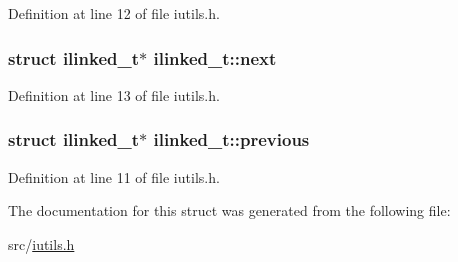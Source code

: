Definition at line 12 of file iutils.\-h.

\hypertarget{structilinked__t_ad3f173c464d58934b12da4eca2ff83f8}{
\subsubsection[{next}]{\setlength{\rightskip}{0pt plus 5cm}struct {\bf ilinked\-\_\-t}$\ast$ ilinked\-\_\-t\-::next}}\label{structilinked__t_ad3f173c464d58934b12da4eca2ff83f8}


Definition at line 13 of file iutils.\-h.

\hypertarget{structilinked__t_a6bace3c90bc1b272be7506fe4d259a71}{
\subsubsection[{previous}]{\setlength{\rightskip}{0pt plus 5cm}struct {\bf ilinked\-\_\-t}$\ast$ ilinked\-\_\-t\-::previous}}\label{structilinked__t_a6bace3c90bc1b272be7506fe4d259a71}


Definition at line 11 of file iutils.\-h.



The documentation for this struct was generated from the following file\-:\begin{DoxyCompactItemize}
\item 
src/\hyperlink{iutils_8h}{iutils.\-h}\end{DoxyCompactItemize}

